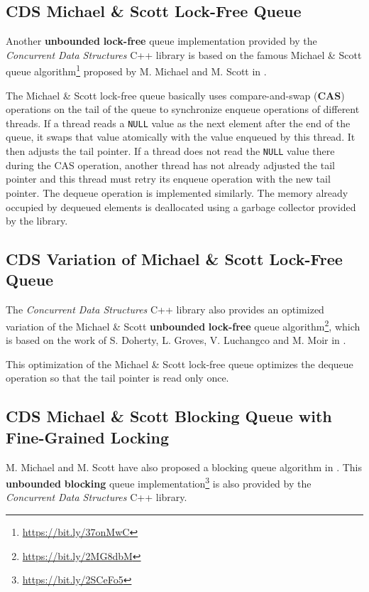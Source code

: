 \subsection[CDS MSQueue]{CDS Michael \& Scott Lock-Free Queue} \label{subsec:cds-ms}

	Another \textbf{unbounded} \textbf{lock-free} queue implementation provided by the \textit{Concurrent Data Structures} C++ library is based on the famous Michael \& Scott queue algorithm\footnote{\url{https://bit.ly/37onMwC}} proposed by M. Michael and M. Scott in \cite{Michael:1996}.
	
	The Michael \& Scott lock-free queue basically uses compare-and-swap (\textbf{CAS}) operations on the tail of the queue to synchronize enqueue operations of different threads. If a thread reads a \texttt{NULL} value as the next element after the end of the queue, it swaps that value atomically with the value enqueued by this thread. It then adjusts the tail pointer. If a thread does not read the \texttt{NULL} value there during the CAS operation, another thread has not already adjusted the tail pointer and this thread must retry its enqueue operation with the new tail pointer. The dequeue operation is implemented similarly. The memory already occupied by dequeued elements is deallocated using a garbage collector provided by the library.

\subsection[CDS MoirQueue]{CDS Variation of Michael \& Scott Lock-Free Queue} \label{subsec:cds-moir}

	The \textit{Concurrent Data Structures} C++ library also provides an optimized variation of the Michael \& Scott \textbf{unbounded} \textbf{lock-free} queue algorithm\footnote{\url{https://bit.ly/2MG8dbM}}, which is based on the work of S. Doherty, L. Groves, V. Luchangco and M. Moir in \cite{Doherty:2004}.
	
	This optimization of the Michael \& Scott lock-free queue optimizes the dequeue operation so that the tail pointer is read only once.

\subsection[CDS RWQueue]{CDS Michael \& Scott Blocking Queue with Fine-Grained Locking} \label{subsec:cds-rw}

	M. Michael and M. Scott have also proposed a blocking queue algorithm in \cite{Michael:1996}. This \textbf{unbounded} \textbf{blocking} queue implementation\footnote{\url{https://bit.ly/2SCeFo5}} is also provided by the \textit{Concurrent Data Structures} C++ library.
	

